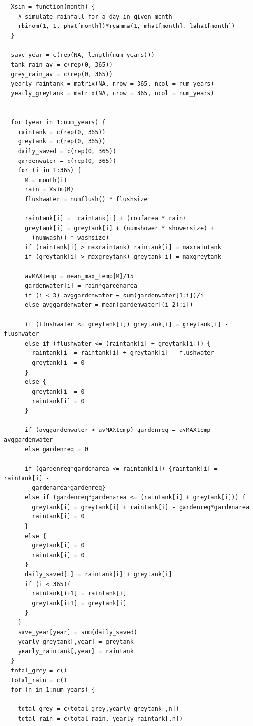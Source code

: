\documentclass[a4paper, 11pt, oneside]{article}
\begin{document}
\begin{verbatim}
  Xsim = function(month) {
    # simulate rainfall for a day in given month
    rbinom(1, 1, phat[month])*rgamma(1, mhat[month], lahat[month])
  }
  
  save_year = c(rep(NA, length(num_years)))
  tank_rain_av = c(rep(0, 365))
  grey_rain_av = c(rep(0, 365))
  yearly_raintank = matrix(NA, nrow = 365, ncol = num_years)
  yearly_greytank = matrix(NA, nrow = 365, ncol = num_years)
  
  
  for (year in 1:num_years) {
    raintank = c(rep(0, 365))
    greytank = c(rep(0, 365))
    daily_saved = c(rep(0, 365))
    gardenwater = c(rep(0, 365))
    for (i in 1:365) {
      M = month(i) 
      rain = Xsim(M) 
      flushwater = numflush() * flushsize
      
      raintank[i] =  raintank[i] + (roofarea * rain)
      greytank[i] = greytank[i] + (numshower * showersize) +
        (numwash() * washsize)
      if (raintank[i] > maxraintank) raintank[i] = maxraintank
      if (greytank[i] > maxgreytank) greytank[i] = maxgreytank
      
      avMAXtemp = mean_max_temp[M]/15
      gardenwater[i] = rain*gardenarea
      if (i < 3) avggardenwater = sum(gardenwater[1:i])/i
      else avggardenwater = mean(gardenwater[(i-2):i])
      
      if (flushwater <= greytank[i]) greytank[i] = greytank[i] - flushwater
      else if (flushwater <= (raintank[i] + greytank[i])) {
        raintank[i] = raintank[i] + greytank[i] - flushwater
        greytank[i] = 0
      } 
      else {
        greytank[i] = 0
        raintank[i] = 0
      }
      
      if (avggardenwater < avMAXtemp) gardenreq = avMAXtemp - avggardenwater 
      else gardenreq = 0
      
      if (gardenreq*gardenarea <= raintank[i]) {raintank[i] = raintank[i] - 
        gardenarea*gardenreq}
      else if (gardenreq*gardenarea <= (raintank[i] + greytank[i])) {
        greytank[i] = greytank[i] + raintank[i] - gardenreq*gardenarea
        raintank[i] = 0
      } 
      else {
        greytank[i] = 0
        raintank[i] = 0
      }
      daily_saved[i] = raintank[i] + greytank[i]
      if (i < 365){
        raintank[i+1] = raintank[i]
        greytank[i+1] = greytank[i]
      }
    }
    save_year[year] = sum(daily_saved)
    yearly_greytank[,year] = greytank
    yearly_raintank[,year] = raintank
  }
  total_grey = c()
  total_rain = c()
  for (n in 1:num_years) {
    
    total_grey = c(total_grey,yearly_greytank[,n])
    total_rain = c(total_rain, yearly_raintank[,n])
    

\end{verbatim}
\end{document}
